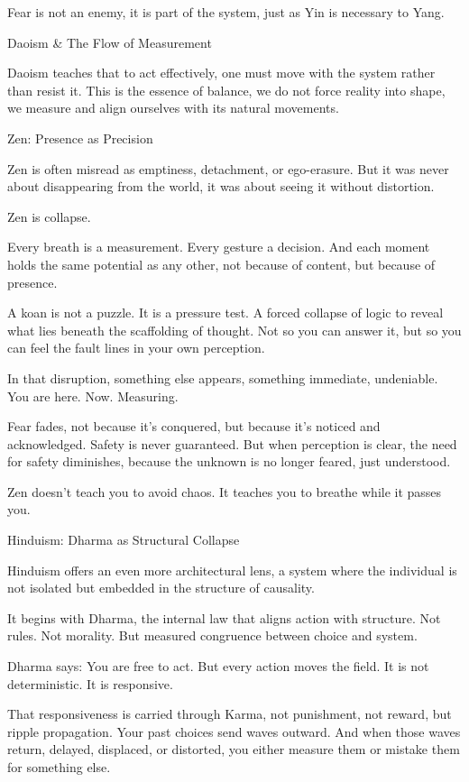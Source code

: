 \documentclass[11pt]{article}
\begin{document}
Fear is not an enemy, it is part of the system, just as Yin is necessary to Yang.

Daoism & The Flow of Measurement

Daoism teaches that to act effectively, one must move with the system rather than resist it. This is the essence of balance, we do not force reality into shape, we measure and align ourselves with its natural movements.

Zen: Presence as Precision

Zen is often misread as emptiness, detachment, or ego-erasure. But it was never about disappearing from the world, it was about seeing it without distortion.

Zen is collapse.

Every breath is a measurement. Every gesture a decision.
And each moment holds the same potential as any other, not because of content, but because of presence.

A koan is not a puzzle. It is a pressure test. A forced collapse of logic to reveal what lies beneath the scaffolding of thought. Not so you can answer it, but so you can feel the fault lines in your own perception.

In that disruption, something else appears, something immediate, undeniable. 
You are here. Now. Measuring.

Fear fades, not because it’s conquered, but because it’s noticed and acknowledged. 
Safety is never guaranteed. But when perception is clear, the need for safety diminishes, because the unknown is no longer feared, just understood.

Zen doesn’t teach you to avoid chaos.
It teaches you to breathe while it passes you.

Hinduism: Dharma as Structural Collapse

Hinduism offers an even more architectural lens, a system where the individual is not isolated but embedded in the structure of causality.

It begins with Dharma, the internal law that aligns action with structure.
Not rules. Not morality. But measured congruence between choice and system.

Dharma says: You are free to act. But every action moves the field.
It is not deterministic. It is responsive.

That responsiveness is carried through Karma, not punishment, not reward, but ripple propagation. Your past choices send waves outward. And when those waves return, delayed, displaced, or distorted, you either measure them or mistake them for something else.
\end{document}
